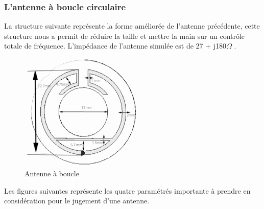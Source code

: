 \documentclass[11pt, a4paper, twoside]{book}
\begin{document}
\subsubsection{L'antenne à boucle circulaire}
La structure suivante représente  la forme améliorée de l'antenne précédente, cette structure nous a permit de réduire la taille et mettre la main sur un contrôle totale de fréquence. L'impédance de l'antenne simulée est  de 27 + j180\(\Omega\)
.
\begin{figure}[H]
\centering
\includegraphics[width=6cm]{1STee}
\caption{Antenne à boucle}
\end{figure}
Les figures suivantes représente les quatre paramétrés importante à prendre en considération pour le jugement d'une antenne. \\\\\\\\\\\\
\end{document}
